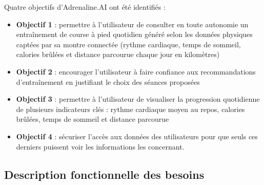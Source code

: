\documentclass[french]{article}
\begin{document}
    Quatre objectifs d'Adrenaline.AI ont été identifiés :
    \begin{itemize}
        \item \textbf{Objectif 1} : permettre à l'utilisateur de consulter en toute autonomie un entraînement de course à pied quotidien généré selon les données physiques captées par sa montre connectée (rythme cardiaque, temps de sommeil, calories brûlées et distance parcourue chaque jour en kilomètres)
        \item \textbf{Objectif 2} : encourager l'utilisateur à faire confiance aux recommandations d'entraînement en justifiant le choix des séances proposées
        \item \textbf{Objectif 3} : permettre à l'utilisateur de visualiser la progression quotidienne de plusieurs indicateurs clés : rythme cardiaque moyen au repos, calories brûlées, temps de sommeil et distance parcourue
        \item \textbf{Objectif 4} : sécuriser l'accès aux données des utilisateurs pour que seuls ces derniers puissent voir les informations les concernant.
    \end{itemize}

    \subsection{Description fonctionnelle des besoins}
\end{document}
